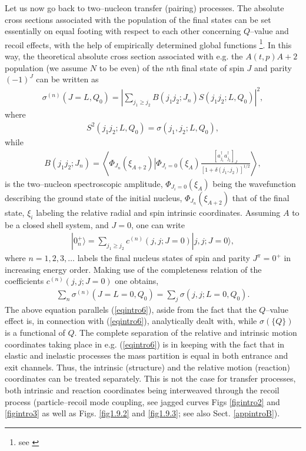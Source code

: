 Let us now go back to two--nucleon transfer (pairing) processes. The  absolute cross sections associated with the population of the final states can be set essentially on equal footing with respect to each other  concerning  $Q$--value and recoil effects, with the help of empirically determined global functions \footnote{see \cite{Broglia:72b}}. In this way, the theoretical absolute cross section associated with e.g. the $A(t,p)A+2$ population (we assume $N$ to be even) of the $n$th final state of spin $J$ and parity $(-1)^J$ can be written as 
\begin{align}
\sigma^{(n)}(J=L,Q_0)=\left|\sum_{j_1\geq j_2}B(j_1 j_2;J_n)S(j_1 j_2 ;L,Q_0)\right|^2,
\end{align}
where
\begin{align}
S^2(j_1 j_2 ;L,Q_0)=\sigma(j_1,j_2;L,Q_0),
\end{align}
while
\begin{align}
B(j_1j_2;J_n)=\left\langle \Phi_{J_n}(\xi_{A+2})\left|\Phi_{J_i=0}(\xi_A)\right.\frac{\left[a^\dagger_{j_1}a^\dagger_{j_2}\right]_J}{\left[1+\delta(j_1,j_2)\right]^{1/2}}\right\rangle,
\end{align}
is the two--nucleon spectroscopic amplitude, $\Phi_{J_i=0}(\xi_A)$ being the wavefunction describing the ground state of the initial nucleus, $\Phi_{J_n}(\xi_{A+2})$ that of the final state, $\xi_i$ labeling the relative radial and spin intrinsic coordinates. Assuming $A$ to be a closed shell system, and $J=0$, one can write
\begin{align}
|0^+_n\rangle=\sum_{j_1\geq j_2}c^{(n)}(j,j;J=0)|j,j;J=0\rangle,
\end{align}
where $n=1,2,3,\dots$ labels the final nucleus states of spin and parity $J^\pi=0^+$ in increasing energy order. Making use of the completeness relation of the coefficients $c^{(n)}(j,j;J=0)$ one obtains,
\begin{align}\label{eqintro12}
\sum_n \sigma^{(n)}(J=L=0,Q_0)=\sum_j\sigma(j,j;L=0,Q_0).
\end{align}
The above equation parallels (\ref{eqintro6}), aside from the fact that the $Q$--value effect is, in connection with (\ref{eqintro6}), analytically dealt with, while $\sigma(\{Q\})$ is a functional of $Q$. The complete separation of the relative and intrinsic motion coordinates taking place in e.g. (\ref{eqintro6}) is in keeping with the fact that in elastic and inelastic processes the mass partition is equal in both entrance and exit channels. Thus, the intrinsic (structure) and the relative motion (reaction) coordinates can be treated separately. This is not the case for transfer processes, both intrinsic and reaction coordinates being interweaved through the recoil process (particle--recoil mode coupling, see jagged curves Figs \ref{figintro2} and \ref{figintro3} as well as Figs. \ref{fig1.9.2} and \ref{fig1.9.3}; see also Sect. \ref{appintroB}). 





